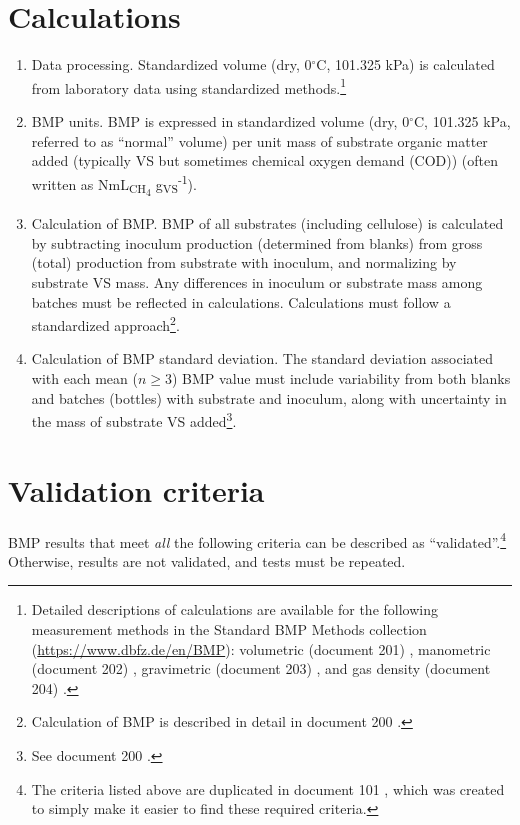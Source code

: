 \documentclass[]{article}
\begin{document}
\section{Calculations}
\label{sec:calculations}
\begin{enumerate}
  \item Data processing.
    Standardized  volume (dry, 0$^\circ$C, 101.325 kPa) is calculated from laboratory data using standardized methods.\footnote{
      Detailed descriptions of calculations are available for the following measurement methods in the Standard BMP Methods collection (\url{https://www.dbfz.de/en/BMP}): volumetric (document 201) \citep{BMPdoc201vol}, manometric (document 202) \citep{BMPdoc202man}, gravimetric (document 203) \citep{BMPdoc203grav}, and gas density (document 204) \citep{BMPdoc204gasdens}.
    }
  \item BMP units.
	  BMP is expressed in standardized  volume (dry, 0$^\circ$C, 101.325 kPa, referred to as ``normal'' volume) per unit mass of substrate organic matter added (typically VS but sometimes chemical oxygen demand (COD)) (often written as NmL\textsubscript{CH\textsubscript{4}} g\textsubscript{VS}\textsuperscript{-1}). 
  \item Calculation of BMP.
    BMP of all substrates (including cellulose) is calculated by subtracting inoculum  production (determined from blanks) from gross (total)  production from substrate with inoculum, and normalizing by substrate VS mass.
    Any differences in inoculum or substrate mass among batches must be reflected in calculations.
    Calculations must follow a standardized approach\footnote{
      Calculation of BMP is described in detail in document 200 \citep{BMPdoc200BMP}.
    }.
  \item Calculation of BMP standard deviation.
    The standard deviation associated with each mean ($n \ge 3$) BMP value must include variability from both blanks and batches (bottles) with substrate and inoculum, along with uncertainty in the mass of substrate VS added\footnote{
      See document 200 \citep{BMPdoc200BMP}. 
    }.
\end{enumerate}

\section{Validation criteria}
\label{sec:crit}
BMP results that meet \textit{all} the following criteria can be described as ``validated''.\footnote{
The criteria listed above are duplicated in document 101 \citep{BMPdoc101val}, which was created to simply make it easier to find these required criteria.
}
Otherwise, results are not validated, and tests must be repeated.
\end{document}
